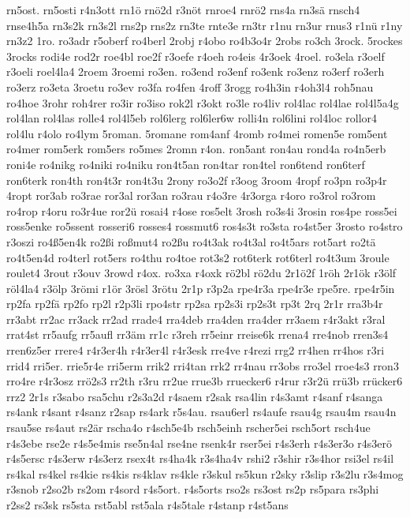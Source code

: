 {rn5ost.
rn5osti
r4n3ott
rn1ö
rnö2d
r3nöt
rnroe4
rnrö2
rns4a
rn3sä
rnsch4
rnse4h5a
rn3s2k
rn3s2l
rns2p
rns2z
rn3te
rnte3e
rn3tr
r1nu
rn3ur
rnus3
r1nü
r1ny
rn3z2
1ro.
ro3adr
r5oberf
ro4berl
2robj
r4obo
ro4b3o4r
2robs
ro3ch
3rock.
5rockes
3rocks
rodi4e
rod2r
roe4bl
roe2f
r3oefe
r4oeh
ro4eis
4r3oek
4roel.
ro3ela
r3oelf
r3oeli
roel4la4
2roem
3roemi
ro3en.
ro3end
ro3enf
ro3enk
ro3enz
ro3erf
ro3erh
ro3erz
ro3eta
3roetu
ro3ev
ro3fa
ro4fen
4roff
3rogg
ro4h3in
r4oh3l4
roh5nau
ro4hoe
3rohr
roh4rer
ro3ir
ro3iso
rok2l
r3okt
ro3le
ro4liv
rol4lac
rol4lae
rol4l5a4g
rol4lan
rol4las
rolle4
rol4l5eb
rol6lerg
rol6ler6w
rolli4n
rol6lini
rol4loc
rollor4
rol4lu
r4olo
ro4lym
5roman.
5romane
rom4anf
4romb
ro4mei
romen5e
rom5ent
ro4mer
rom5erk
rom5ers
ro5mes
2romn
r4on.
ron5ant
ron4au
rond4a
ro4n5erb
roni4e
ro4nikg
ro4niki
ro4niku
ron4t5an
ron4tar
ron4tel
ron6tend
ron6terf
ron6terk
ron4th
ron4t3r
ron4t3u
2rony
ro3o2f
r3oog
3room
4ropf
ro3pn
ro3p4r
4ropt
ror3ab
ro3rae
ror3al
ror3an
ro3rau
r4o3re
4r3orga
r4oro
ro3rol
ro3rom
ro4rop
r4oru
ro3r4ue
ror2ü
rosai4
r4ose
ros5elt
3rosh
ro3s4i
3rosin
ros4pe
ross5ei
ross5enke
ro5ssent
rosseri6
rosses4
rossmut6
ros4s3t
ro3sta
ro4st5er
3rosto
ro4stro
r3oszi
ro4ß5en4k
ro2ßi
roßmut4
ro2ßu
ro4t3ak
ro4t3al
ro4t5ars
rot5art
ro2tä
ro4t5en4d
ro4terl
rot5ers
ro4thu
ro4toe
rot3s2
rot6terk
rot6terl
ro4t3um
3roule
roulet4
3rout
r3ouv
3rowd
r4ox.
ro3xa
r4oxk
rö2bl
rö2du
2r1ö2f
1röh
2r1ök
r3ölf
röl4la4
r3ölp
3römi
r1ör
3rösl
3rötu
2r1p
r3p2a
rpe4r3a
rpe4r3e
rpe5re.
rpe4r5in
rp2fa
rp2fä
rp2fo
rp2l
r2p3li
rpo4str
rp2sa
rp2s3i
rp2s3t
rp3t
2rq
2r1r
rra3b4r
rr3abt
rr2ac
rr3ack
rr2ad
rrade4
rra4deb
rra4den
rra4der
rr3aem
r4r3akt
r3ral
rrat4st
rr5aufg
rr5aufl
rr3äm
rr1c
r3reh
rr5einr
rreise6k
rrena4
rre4nob
rren3s4
rren6z5er
rrere4
r4r3er4h
r4r3er4l
r4r3esk
rre4ve
r4rezi
rrg2
rr4hen
rr4hos
r3ri
rrid4
rri5er.
rrie5r4e
rri5erm
rrik2
rri4tan
rrk2
rr4nau
rr3obs
rro3el
rroe4s3
rron3
rro4re
r4r3osz
rrö2s3
rr2th
r3ru
rr2ue
rrue3b
rruecker6
r4rur
r3r2ü
rrü3b
rrücker6
rrz2
2r1s
r3sabo
rsa5chu
r2s3a2d
r4saem
r2sak
rsa4lin
r4s3amt
r4sanf
r4sanga
rs4ank
r4sant
r4sanz
r2sap
rs4ark
r5s4au.
rsau6erl
rs4aufe
rsau4g
rsau4m
rsau4n
rsau5se
rs4aut
rs2är
rscha4o
r4sch5e4b
rsch5einh
rscher5ei
rsch5ort
rsch4ue
r4s3ebe
rse2e
r4s5e4mis
rse5n4al
rse4ne
rsenk4r
rser5ei
r4s3erh
r4s3er3o
r4s3erö
r4s5ersc
r4s3erw
r4s3erz
rsex4t
rs4ha4k
r3s4ha4v
rshi2
r3shir
r3s4hor
rsi3el
rs4il
rs4kal
rs4kel
rs4kie
rs4kis
rs4klav
rs4kle
r3skul
rs5kun
r2sky
r3slip
r3s2lu
r3s4mog
r3snob
r2so2b
rs2om
r4sord
r4s5ort.
r4s5orts
rso2s
rs3ost
rs2p
rs5para
rs3phi
r2ss2
rs3sk
rs5sta
rst5abl
rst5ala
r4s5tale
r4stanp
r4st5ans
}

